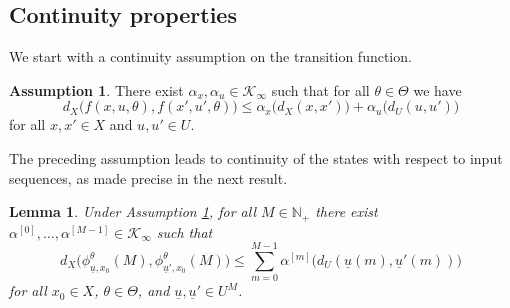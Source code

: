 \documentclass[letterpaper, 10 pt, conference]{IEEEconf}  %
\newcommand{\Np}{\mathbb{N}_+} %
\newcommand{\cKi}{\mathcal{K}_\infty} %
\newcommand{\s}{\phi} %
\newcommand{\is}[1]{{\underline{#1}}} %
\theoremstyle{theorem}
\newtheorem{lemma}[theorem]{Lemma}
\theoremstyle{definition}
\newtheorem{assumption}{Assumption}
\theoremstyle{remark}
\begin{document}
\subsection{Continuity properties}
We start with a continuity assumption on the transition function.
\begin{assumption} \label{assump:dteoc:continuityOfTransitionFunction}
There exist $\alpha_x,\alpha_u\in\cKi$ such that for all $\theta\in\Theta$ we have
\begin{equation*}
    d_X \big( f(x,u,\theta), f(x',u',\theta) \big) \leq \alpha_x\big( d_X(x,x') \big) + \alpha_u \big( d_U(u,u') \big)
\end{equation*}
for all $x,x'\in X$ and $u,u' \in U$. 
\end{assumption}
The preceding assumption leads to continuity of the states with respect to input sequences, as made precise in the next result.
\begin{lemma} \label{lem:dteoc:continuityOfStates}
Under Assumption \ref{assump:dteoc:continuityOfTransitionFunction}, for all $M\in\Np$ there exist $\alpha^{[0]},\ldots,\alpha^{[M-1]}\in\cKi$ such that
\begin{equation*}
    d_X\big( \s_{\is{u},x_0}^\theta(M),\s_{\is{u}',x_0}^\theta(M) \big) \leq \sum_{m=0}^{M-1} \alpha^{[m]}\big(d_U(\is{u}(m),\is{u}'(m))\big)
\end{equation*}
for all $x_0\in X$, $\theta \in \Theta$, and $\is{u},\is{u}'\in U^M$.
\end{lemma}
\end{document}
